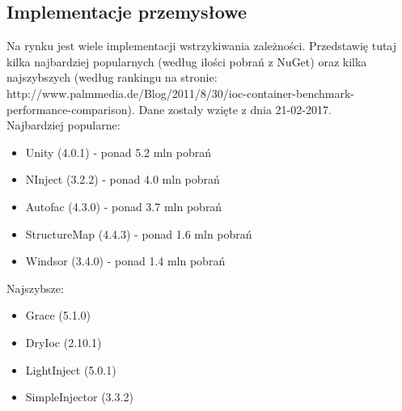 \documentclass[12pt]{article}
\begin{document}
\subsection{Implementacje przemysłowe}
Na rynku jest wiele implementacji wstrzykiwania zależności. Przedstawię tutaj kilka najbardziej popularnych (według ilości pobrań z NuGet) oraz kilka najszybszych (według rankingu na stronie: http://www.palmmedia.de/Blog/2011/8/30/ioc-container-benchmark-performance-comparison). Dane zostały wzięte z dnia 21-02-2017.\\
Najbardziej popularne:
\begin{itemize}
	\item Unity (4.0.1) - ponad 5.2 mln pobrań
	\item NInject (3.2.2) - ponad 4.0 mln pobrań
	\item Autofac (4.3.0) - ponad 3.7 mln pobrań
	\item StructureMap (4.4.3) - ponad 1.6 mln pobrań
	\item Windsor (3.4.0) - ponad 1.4 mln pobrań
\end{itemize}
Najszybsze:
\begin{itemize}
	\item Grace (5.1.0)
	\item DryIoc (2.10.1)
	\item LightInject (5.0.1)
	\item SimpleInjector (3.3.2)
\end{itemize}



\clearpage
\end{document}
